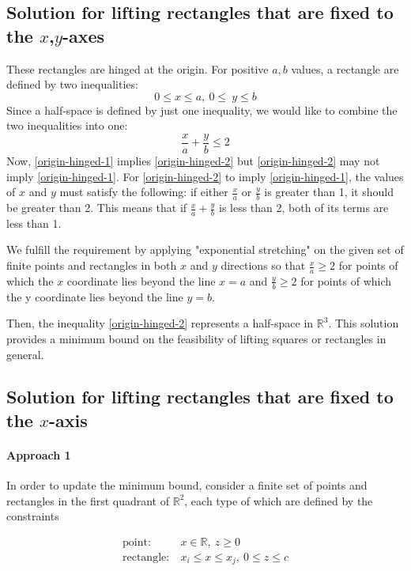 \documentclass{NSF}
\begin{document}
\subsection{Solution for lifting rectangles that are fixed to the $x$,$y$-axes}
These rectangles are hinged at the origin. For positive $a,b$ values, a rectangle are defined by two inequalities: 
\begin{equation}\label{origin-hinged-1}
0 \leq x \leq a,\  0\leq \  y \leq b
\end{equation}
Since a half-space is defined by just one inequality, we would like to combine the two inequalities into one: 
\begin{equation}\label{origin-hinged-2}
\frac{x}{a} + \frac{y}{b} \leq 2
\end{equation}
Now, \eqref{origin-hinged-1} implies \eqref{origin-hinged-2} but \eqref{origin-hinged-2}  may not imply \eqref{origin-hinged-1}. For \eqref{origin-hinged-2} to imply \eqref{origin-hinged-1}, the values of $x$ and $y$ must satisfy the following: if either $\frac{x}{a}$ or $\frac{y}{b}$ is greater than 1, it should be greater than 2. This means that if $\frac{x}{a}+\frac{y}{b}$  is less than 2, both of its terms are less than 1.

We fulfill the requirement by applying "exponential stretching" on the given set of finite points and rectangles in both $x$ and $y$ directions so that $\frac{x}{a} \geq 2$  for points of which the $x$ coordinate lies beyond the line $x=a$ and $\frac{y}{b} \geq 2$ for points of which the y coordinate lies beyond the line $y=b$. 

Then, the inequality \eqref{origin-hinged-2} represents a half-space in $\mathbb{R}^3$. This solution provides a minimum bound on the feasibility of lifting squares or rectangles in general.



\subsection{Solution for lifting rectangles that are fixed to the $x$-axis}
\paragraph{Approach 1}
In order to update the minimum bound, consider a finite set of points and rectangles in the first quadrant of $\mathbb{R}^2$, each type of which are defined by the constraints

\begin{align*}
    \text{point:}& \ x \in \mathbb{R},\  z \geq 0 \\
    \text{rectangle:}& \ x_i \leq x \leq x_j,\ 0 \leq z \leq c
\end{align*}
\end{document}
